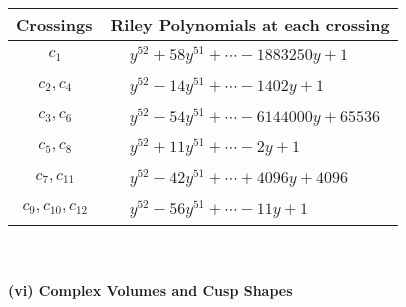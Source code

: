 \documentclass[1p]{elsarticle_modified}
\theoremstyle{definition}
\begin{document}
\begin{tabular}{m{50pt}|m{274pt}}
Crossings & \hspace{64pt}Riley Polynomials at each crossing \\
\hline $$\begin{aligned}c_{1}\end{aligned}$$&$\begin{aligned}
&y^{52}+58 y^{51}+\cdots-1883250 y+1
\end{aligned}$\\
\hline $$\begin{aligned}c_{2},c_{4}\end{aligned}$$&$\begin{aligned}
&y^{52}-14 y^{51}+\cdots-1402 y+1
\end{aligned}$\\
\hline $$\begin{aligned}c_{3},c_{6}\end{aligned}$$&$\begin{aligned}
&y^{52}-54 y^{51}+\cdots-6144000 y+65536
\end{aligned}$\\
\hline $$\begin{aligned}c_{5},c_{8}\end{aligned}$$&$\begin{aligned}
&y^{52}+11 y^{51}+\cdots-2 y+1
\end{aligned}$\\
\hline $$\begin{aligned}c_{7},c_{11}\end{aligned}$$&$\begin{aligned}
&y^{52}-42 y^{51}+\cdots+4096 y+4096
\end{aligned}$\\
\hline $$\begin{aligned}c_{9},c_{10},c_{12}\end{aligned}$$&$\begin{aligned}
&y^{52}-56 y^{51}+\cdots-11 y+1
\end{aligned}$\\
\hline
\end{tabular}\\~\\
\newpage\flushleft \textbf{(vi) Complex Volumes and Cusp Shapes}
\end{document}

